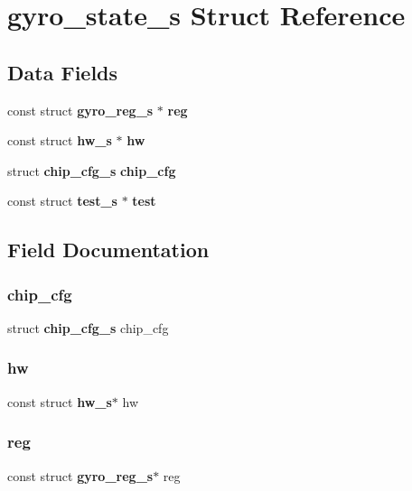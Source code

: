 \section{gyro\+\_\+state\+\_\+s Struct Reference}
\label{structgyro__state__s}
\subsection*{Data Fields}
\begin{DoxyCompactItemize}
\item 
const struct \textbf{ gyro\+\_\+reg\+\_\+s} $\ast$ \textbf{ reg}
\item 
const struct \textbf{ hw\+\_\+s} $\ast$ \textbf{ hw}
\item 
struct \textbf{ chip\+\_\+cfg\+\_\+s} \textbf{ chip\+\_\+cfg}
\item 
const struct \textbf{ test\+\_\+s} $\ast$ \textbf{ test}
\end{DoxyCompactItemize}


\subsection{Field Documentation}
\mbox{\label{structgyro__state__s_ac895217592e2084bd520b0be8e9d20ee}} 
\subsubsection{chip\+\_\+cfg}
{\footnotesize\ttfamily struct \textbf{ chip\+\_\+cfg\+\_\+s} chip\+\_\+cfg}

\mbox{\label{structgyro__state__s_a5bac30a96752691e4cc723735060e360}} 
\subsubsection{hw}
{\footnotesize\ttfamily const struct \textbf{ hw\+\_\+s}$\ast$ hw}

\mbox{\label{structgyro__state__s_ae857e1285c583b7438a208edd691a38e}} 
\subsubsection{reg}
{\footnotesize\ttfamily const struct \textbf{ gyro\+\_\+reg\+\_\+s}$\ast$ reg}

